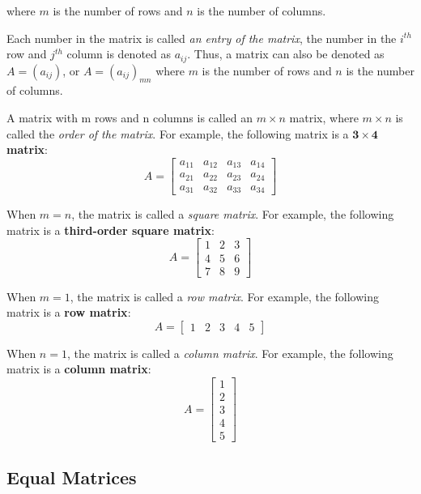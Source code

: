 \documentclass{report}
\begin{document}
\begin{multicols}{2}
  where $m$ is the number of rows and $n$ is the number of columns.

  Each number in the matrix is called \emph{an entry of the matrix}, the number
  in the $i^{th}$ row and $j^{th}$ column is denoted as $a_{ij}$. Thus, a matrix
  can also be denoted as $A = (a_{ij})$, or $A = {(a_{ij})}_{mn}$ where $m$ is
  the number of rows and $n$ is the number of columns.

  A matrix with m rows and n columns is called an $m \times n$ matrix, where $m
    \times n$ is called the \emph{order of the matrix}. For example, the following
  matrix is a \textbf{$\mathbf{3 \times 4}$ matrix}:
  \[
    A = \begin{bmatrix}
      a_{11} & a_{12} & a_{13} & a_{14} \\
      a_{21} & a_{22} & a_{23} & a_{24} \\
      a_{31} & a_{32} & a_{33} & a_{34}
    \end{bmatrix}
  \]

  When $m = n$, the matrix is called a \emph{square matrix}. For example, the
  following matrix is a \textbf{third-order square matrix}:
  \[
    A = \begin{bmatrix}
      1 & 2 & 3 \\
      4 & 5 & 6 \\
      7 & 8 & 9
    \end{bmatrix}
  \]

  When $m = 1$, the matrix is called a \emph{row matrix}. For example, the
  following matrix is a \textbf{row matrix}:
  \[
    A = \begin{bmatrix}
      1 & 2 & 3 & 4 & 5
    \end{bmatrix}
  \]

  When $n = 1$, the matrix is called a \emph{column matrix}. For example, the
  following matrix is a \textbf{column matrix}:
  \[
    A = \begin{bmatrix}
      1 \\
      2 \\
      3 \\
      4 \\
      5
    \end{bmatrix}
  \]

  \singlespacing{}

  \subsection*{Equal Matrices}


\end{multicols}
\end{document}
